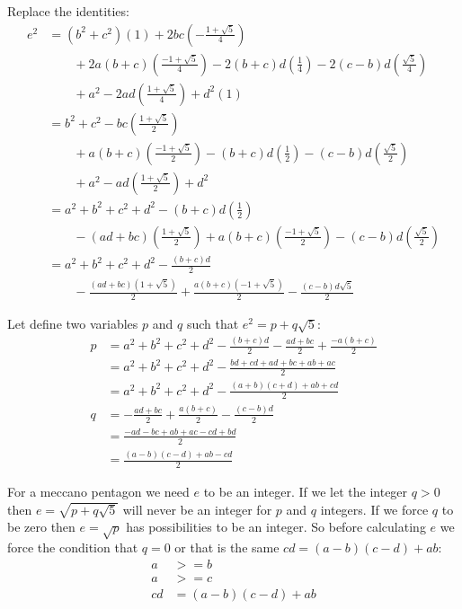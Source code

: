 \documentclass[11pt]{article}
\begin{document}
Replace the identities:
\begin{align*}
e^2 &= (b^2+c^2)(1) + 2bc(-\frac{1 + \sqrt{5}}{4})\\
    &\qquad + 2a(b+c)(\frac{-1+\sqrt{5}}{4}) - 2(b+c)d(\frac{1}{4}) - 2(c-b)d(\frac{\sqrt{5}}{4})\\
    &\qquad + a^2 - 2ad(\frac{1+\sqrt{5}}{4}) + d^2(1)\\
    &= b^2+c^2 - bc(\frac{1 + \sqrt{5}}{2})\\
    &\qquad + a(b+c)(\frac{-1+\sqrt{5}}{2}) - (b+c)d(\frac{1}{2}) - (c-b)d(\frac{\sqrt{5}}{2})\\
    &\qquad + a^2 - ad(\frac{1+\sqrt{5}}{2}) + d^2\\
    &= a^2+b^2+c^2 + d^2 - (b+c)d(\frac{1}{2}) \\
    &\qquad - (ad+bc)(\frac{1 + \sqrt{5}}{2}) + a(b+c)(\frac{-1+\sqrt{5}}{2}) - (c-b)d(\frac{\sqrt{5}}{2})\\
    &= a^2+b^2+c^2 + d^2 - \frac{(b+c)d}{2} \\
    &\qquad - \frac{(ad+bc)(1 + \sqrt{5})}{2} + \frac{a(b+c)(-1+\sqrt{5})}{2} - \frac{(c-b)d\sqrt{5}}{2}
\end{align*}

Let define two variables $p$ and $q$ such that $e^2 = p + q\sqrt{5}$:
\begin{align*}
p &= a^2+b^2+c^2 + d^2 - \frac{(b+c)d}{2} - \frac{ad+bc}{2} + \frac{-a(b+c)}{2}\\
  &= a^2+b^2+c^2 + d^2 - \frac{bd +cd +ad +bc +ab + ac}{2}\\
  &= a^2+b^2+c^2 + d^2 - \frac{(a+b)(c+d)+ab+cd}{2}\\
q &= - \frac{ad+bc}{2} + \frac{a(b+c)}{2} - \frac{(c-b)d}{2}\\
  &= \frac{-ad - bc + ab + ac - cd + bd}{2}\\
  &= \frac{(a-b)(c-d) + ab - cd}{2}
\end{align*}

For a meccano pentagon we need $e$ to be an integer. If we let the integer $q > 0$ then $e = \sqrt{p + q\sqrt{5}}$ will never be an integer for $p$ and $q$ integers. If we force $q$ to be zero then $e = \sqrt{p}$ has possibilities to be an integer.
So before calculating $e$ we force the condition that $q = 0$ or that is the same $cd = (a-b)(c-d)+ab$:
\begin{align*}
a  & >= b\\
a  & >= c\\
cd &= (a-b)(c-d)+ab\\
\end{align*}
\end{document}
